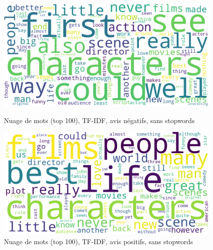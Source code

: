 \documentclass{article}
\begin{document}
\begin{figure}[H]
    \centering
    \begin{minipage}{0.48\textwidth}
        \includegraphics[width=\textwidth]{./src/movies/wordclouds_neg_stopwords_tfidf.png} 
        \caption{Nuage de mots (top 100), TF-IDF, avis négatifs, sans stopwords}
        \label{wordclouds_neg_stopwords_tfidf}
    \end{minipage}
    \hfill
    \begin{minipage}{0.48\textwidth}
        \includegraphics[width=\textwidth]{./src/movies/wordclouds_pos_stopwords_tfidf.png} 
        \caption{Nuage de mots (top 100), TF-IDF, avis positifs, sans stopwords}
        \label{wordclouds_pos_stopwords_tfidf}
    \end{minipage}
\end{figure}
\end{document}
